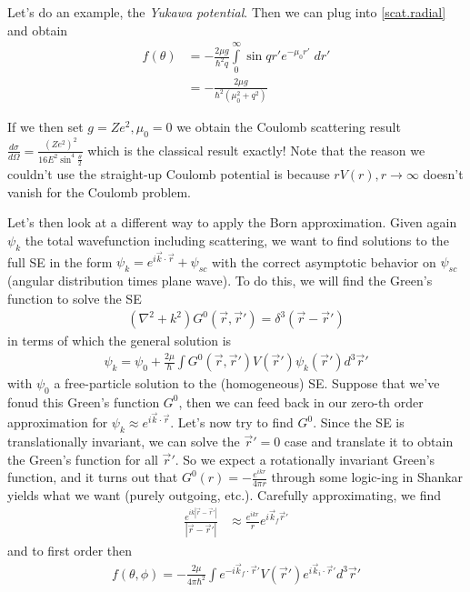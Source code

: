 \documentclass[10pt]{report}
\newcommand{\rd}[2]{\frac{d#1}{d#2}}
\newcommand{\abs}[1]{\left|#1\right|}
\begin{document}
Let's do an example, the \emph{Yukawa potential}. Then we can plug into \ref{scat.radial} and obtain
\begin{align}
    f(\theta) &= -\frac{2\mu g}{\hbar^2 q}\displaystyle\int\limits_{0}^{\infty}\sin qr' e^{-\mu_0 r'}\;dr'\\
    &= -\frac{2\mu g}{\hbar^2(\mu_0^2 + q^2)}
\end{align}

If we then set $g=Ze^2, \mu_0 = 0$ we obtain the Coulomb scattering result $\rd{\sigma}{\Omega} = \frac{(Ze^2)^2}{16E^2\sin^4 \frac{\theta}{2}}$ which is the classical result exactly! Note that the reason we couldn't use the straight-up Coulomb potential is because $rV(r), r \to \infty$ doesn't vanish for the Coulomb problem. 

Let's then look at a different way to apply the Born approximation. Given again $\psi_k$ the total wavefunction including scattering, we want to find solutions to the full SE in the form $\psi_k = e^{i\vec{k}\cdot \vec{r}} + \psi_{sc}$ with the correct asymptotic behavior on $\psi_{sc}$ (angular distribution times plane wave). To do this, we will find the Green's function to solve the SE
\begin{align}
    (\nabla^2 + k^2)G^{0}(\vec{r}, \vec{r}') = \delta^3(\vec{r} - \vec{r}')
\end{align}
in terms of which the general solution is
\begin{align}
    \psi_k = \psi_0 + \frac{2\mu}{\hbar}\int G^0(\vec{r}, \vec{r}')V(\vec{r}') \psi_k(\vec{r}')d^3\vec{r}'
\end{align}
with $\psi_0$ a free-particle solution to the (homogeneous) SE. Suppose that we've fonud this Green's function $G^0$, then we can feed back in our zero-th order approximation for $\psi_k \approx e^{i\vec{k}\cdot \vec{r}}$. Let's now try to find $G^0$. Since the SE is translationally invariant, we can solve the $\vec{r}' = 0$ case and translate it to obtain the Green's function for all $\vec{r}'$. So we expect a rotationally invariant Green's function, and it turns out that $G^0(r) = -\frac{e^{ikr}}{4\pi r}$ through some logic-ing in Shankar yields what we want (purely outgoing, etc.). Carefully approximating, we find 
\begin{align}
    \frac{e^{ik\abs{\vec{r} - \vec{r}'}}}{\abs{\vec{r} - \vec{r}'}} &\approx \frac{e^{ikr}}{r}e^{i\vec{k}_f\vec{r}'}
\end{align}
and to first order then
\begin{align}
    f(\theta,\phi) = -\frac{2\mu}{4\pi\hbar^2}\int e^{-i\vec{k}_f\cdot \vec{r}'}V(\vec{r}')e^{i\vec{k}_i\cdot \vec{r}'}d^3\vec{r}'
\end{align}
\end{document}
